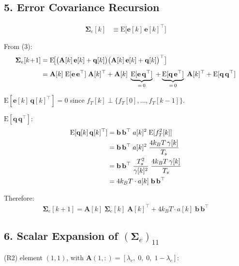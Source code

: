 \documentclass[11pt]{article}
\newcommand{\Se}{\bm{\Sigma}_e}
\begin{document}
\subsection*{5. Error Covariance Recursion}

\begin{align}
\Se[k] &\equiv \mathrm{E}\!\bigl[\mathbf{e}[k]\,\mathbf{e}[k]^\top\bigr]
\end{align}

\noindent From (3):
\begin{align}
\Se[k\!+\!1]
&= \mathrm{E}\!\bigl[
\bigl(\mathbf{A}[k]\,\mathbf{e}[k]+\mathbf{q}[k]\bigr)
\bigl(\mathbf{A}[k]\,\mathbf{e}[k]+\mathbf{q}[k]\bigr)^\top
\bigr] \notag\\[4pt]
&= \mathbf{A}[k]\;\mathrm{E}[\mathbf{e}\,\mathbf{e}^\top]\;\mathbf{A}[k]^\top
+ \mathbf{A}[k]\;\underbrace{\mathrm{E}[\mathbf{e}\,\mathbf{q}^\top]}_{=\,0}\;
+ \underbrace{\mathrm{E}[\mathbf{q}\,\mathbf{e}^\top]}_{=\,0}\;\mathbf{A}[k]^\top
+ \mathrm{E}[\mathbf{q}\,\mathbf{q}^\top]
\end{align}

\noindent $\mathrm{E}[\mathbf{e}[k]\,\mathbf{q}[k]^\top]=0$\; since
$f_T[k] \perp \{f_T[0],\dots,f_T[k\!-\!1]\}$.

\medskip\noindent $\mathrm{E}[\mathbf{q}\,\mathbf{q}^\top]$:
\begin{align}
\mathrm{E}[\mathbf{q}[k]\,\mathbf{q}[k]^\top]
&= \mathbf{b}\,\mathbf{b}^\top\;a[k]^2\;\mathrm{E}[f_T^2[k]] \notag\\
&= \mathbf{b}\,\mathbf{b}^\top\;a[k]^2\;\frac{4k_BT\,\gamma[k]}{T_s} \notag\\
&= \mathbf{b}\,\mathbf{b}^\top\;\frac{T_s^2}{\gamma[k]^2}
\;\frac{4k_BT\,\gamma[k]}{T_s} \notag\\
&= 4k_BT\cdot a[k]\;\mathbf{b}\,\mathbf{b}^\top
\end{align}

\noindent Therefore:
\begin{align}
\boxed{\;
\Se[k\!+\!1]
= \mathbf{A}[k]\;\Se[k]\;\mathbf{A}[k]^\top
+ 4k_BT\cdot a[k]\;\mathbf{b}\,\mathbf{b}^\top
\;}
\tag{R2}
\end{align}

\subsection*{6. Scalar Expansion of $(\Se)_{11}$}

\noindent (R2) element $(1,1)$,\; with
$\mathbf{A}(1,:) = [\lambda_c,\;0,\;0,\;1\!-\!\lambda_c]$:
\end{document}
